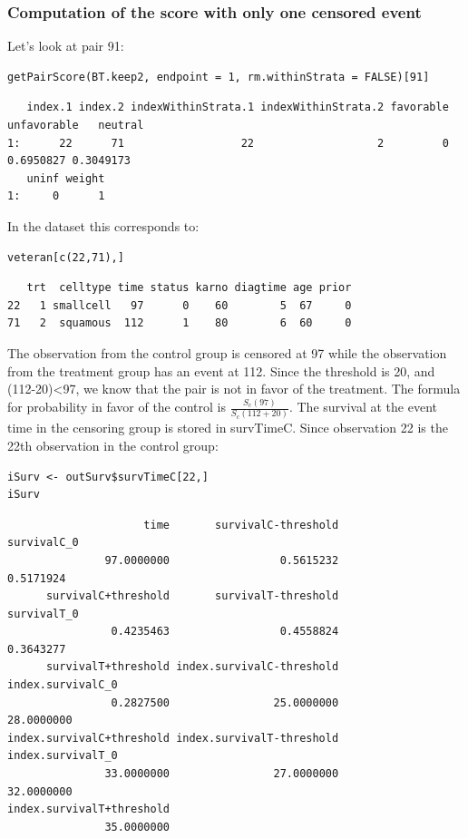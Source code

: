 \documentclass[12pt]{article}
\begin{document}
\subsubsection{Computation of the score with only one censored event}
\label{sec:org013c221}

Let's look at pair 91:
\lstset{language=r,label= ,caption= ,captionpos=b,numbers=none}
\begin{lstlisting}
getPairScore(BT.keep2, endpoint = 1, rm.withinStrata = FALSE)[91]
\end{lstlisting}

\begin{verbatim}
   index.1 index.2 indexWithinStrata.1 indexWithinStrata.2 favorable unfavorable   neutral
1:      22      71                  22                   2         0   0.6950827 0.3049173
   uninf weight
1:     0      1
\end{verbatim}


In the dataset this corresponds to:
\lstset{language=r,label= ,caption= ,captionpos=b,numbers=none}
\begin{lstlisting}
veteran[c(22,71),]
\end{lstlisting}

\begin{verbatim}
   trt  celltype time status karno diagtime age prior
22   1 smallcell   97      0    60        5  67     0
71   2  squamous  112      1    80        6  60     0
\end{verbatim}


The observation from the control group is censored at 97 while the
observation from the treatment group has an event at 112. Since the
threshold is 20, and (112-20)<97, we know that the pair is not in
favor of the treatment. The formula for probability in favor of the
control is \(\frac{S_c(97)}{S_c(112+20)}\). The survival at the event
time in the censoring group is stored in survTimeC. Since observation
22 is the 22th observation in the control group:
\lstset{language=r,label= ,caption= ,captionpos=b,numbers=none}
\begin{lstlisting}
iSurv <- outSurv$survTimeC[22,] 
iSurv
\end{lstlisting}

\begin{verbatim}
                     time       survivalC-threshold               survivalC_0 
               97.0000000                 0.5615232                 0.5171924 
      survivalC+threshold       survivalT-threshold               survivalT_0 
                0.4235463                 0.4558824                 0.3643277 
      survivalT+threshold index.survivalC-threshold         index.survivalC_0 
                0.2827500                25.0000000                28.0000000 
index.survivalC+threshold index.survivalT-threshold         index.survivalT_0 
               33.0000000                27.0000000                32.0000000 
index.survivalT+threshold 
               35.0000000
\end{verbatim}
\end{document}

